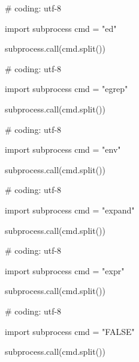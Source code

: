 \begin{mylisting}[label={lst:acpid},language=sh,caption=ed]

# coding: utf-8

import subprocess
cmd = "ed"

subprocess.call(cmd.split())

\end{mylisting}

\begin{mylisting}[label={lst:acpid},language=sh,caption=egrep]

# coding: utf-8

import subprocess
cmd = "egrep"

subprocess.call(cmd.split())

\end{mylisting}

\begin{mylisting}[label={lst:acpid},language=sh,caption=env]

# coding: utf-8

import subprocess
cmd = "env"

subprocess.call(cmd.split())

\end{mylisting}

\begin{mylisting}[label={lst:acpid},language=sh,caption=expand]

# coding: utf-8

import subprocess
cmd = "expand"

subprocess.call(cmd.split())

\end{mylisting}

\begin{mylisting}[label={lst:acpid},language=sh,caption=expr]

# coding: utf-8

import subprocess
cmd = "expr"

subprocess.call(cmd.split())

\end{mylisting}

\begin{mylisting}[label={lst:acpid},language=sh,caption=FALSE]

# coding: utf-8

import subprocess
cmd = "FALSE"

subprocess.call(cmd.split())

\end{mylisting}

